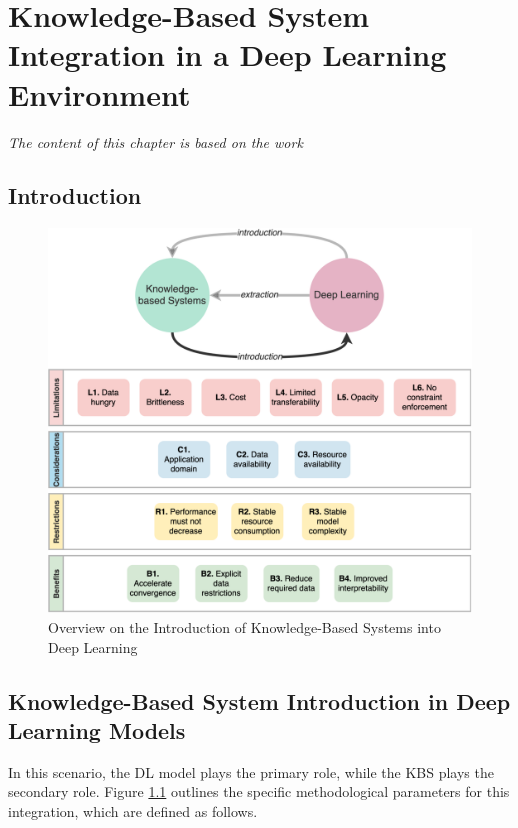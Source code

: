 \chapter{Knowledge-Based System Integration in a Deep Learning Environment}
\label{chap:kbsintegrationdl}
\textit{The content of this chapter is based on the work \cite{amadoretalontodl}}
\section{Introduction}


\begin{figure}[ht]
    \centering
    \includegraphics[width=\linewidth]{4_kbsintegrationdl/figures/overview_kbs_dl_intro.eps}
    \caption{Overview on the Introduction of Knowledge-Based Systems into Deep Learning}
    \label{fig:overview_kbs_dl_intro}
\end{figure}

\section{Knowledge-Based System Introduction in Deep Learning Models} \label{subsec:methodology_kbs_intro_dl}
In this scenario, the DL model plays the primary role, while the KBS plays the secondary role. Figure \ref{fig:overview_kbs_dl_intro} outlines the specific methodological parameters for this integration, which are defined as follows.

